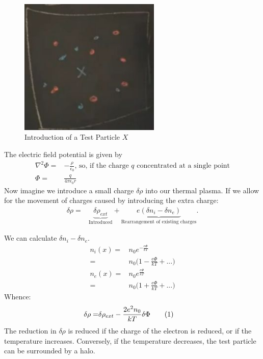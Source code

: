 \documentclass[]{article}
\newcommand\numberthis{\addtocounter{equation}{1}\tag{\theequation}}
\begin{document}
\begin{figure}[H]
	\begin{center}
		\caption{Introduction of a Test Particle $X$}
		\includegraphics[width=0.6\textwidth]{introduce-test-particle}
	\end{center}
\end{figure}
The electric field potential is given by
\begin{align*}
	\nabla^2 \Phi=& -\frac{\rho}{\epsilon_0}  \text{, so, if the charge $q$ concentrated at a single point}\\
	\Phi =& \frac{q}{4 \pi \epsilon_0 r}
\end{align*}
Now imagine we introduce a small charge $\delta \rho$ into our thermal plasma. If we allow for the movement of charges caused by introducing the extra charge:
\begin{align*}
	\delta \rho =& \underbrace{\delta \rho_{ext}}_\text{Introduced} + \underbrace{e(\delta n_i - \delta n_e)}_\text{Rearrangement of existing charges}.
\end{align*}

We can calculate $\delta n_i - \delta n_e$.
\begin{align*}
	n_i(x)=&n_0 e^{- \frac{e\Phi}{kT}}\\
	=& n_0\big(1 - \frac{e\Phi}{kT} +...\big)\\
	n_e(x)=&n_0 e^{ \frac{e\Phi}{kT}}\\
	=& n_0\big(1 + \frac{e\Phi}{kT} +...\big)
\end{align*}
Whence:
\begin{align*}
	\delta \rho =& \delta \rho_{ext} - \frac{2 e^2 n_0}{kT}\delta \Phi \numberthis \label{eq:delta:rho}
\end{align*}
The reduction in $\delta \rho$ is reduced if the charge of the electron is reduced, or if the temperature increases. Conversely, if the temperature decreases, the test particle can be surrounded by a halo.
\end{document}
